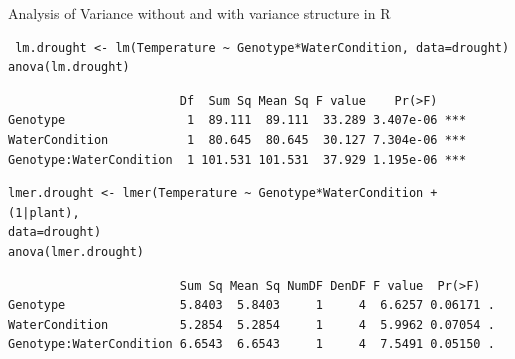 \documentclass[10pt]{beamer}
\makeatletter
\newenvironment{kframe}{%
 \def\at@end@of@kframe{}%
 \ifinner\ifhmode%
  \def\at@end@of@kframe{\end{minipage}}%
  \begin{minipage}{\columnwidth}%
 \fi\fi%
 \def\FrameCommand##1{\hskip\@totalleftmargin \hskip-\fboxsep
 \colorbox{shadecolor}{##1}\hskip-\fboxsep
     \hskip-\linewidth \hskip-\@totalleftmargin \hskip\columnwidth}%
 \MakeFramed {\advance\hsize-\width
   \@totalleftmargin\z@ \linewidth\hsize
   \@setminipage}}%
 {\par\unskip\endMakeFramed%
 \at@end@of@kframe}
\newenvironment{knitrout}{}{} %
\makeatother
\begin{document}
\begin{frame}[fragile]{Analysis of Variance without and with variance structure in R}
 
 \pause 
  \begin{knitrout}
 \footnotesize
{}\color{fgcolor}\begin{kframe}
\begin{verbatim}
 lm.drought <- lm(Temperature ~ Genotype*WaterCondition, data=drought)
anova(lm.drought)

\end{verbatim}
\end{kframe}
\end{knitrout}
\pause
  \begin{knitrout}
 \footnotesize
{}\color{fgcolor}\begin{kframe}
\begin{verbatim}
                        Df  Sum Sq Mean Sq F value    Pr(>F)    
Genotype                 1  89.111  89.111  33.289 3.407e-06 ***
WaterCondition           1  80.645  80.645  30.127 7.304e-06 ***
Genotype:WaterCondition  1 101.531 101.531  37.929 1.195e-06 ***
\end{verbatim}
\end{kframe}
\end{knitrout}

\pause
 \begin{knitrout}
 \footnotesize
{}\color{fgcolor}\begin{kframe}
\begin{verbatim}
lmer.drought <- lmer(Temperature ~ Genotype*WaterCondition + (1|plant),
data=drought)
anova(lmer.drought)
\end{verbatim}
\end{kframe}
\end{knitrout}

  \begin{knitrout}
 \footnotesize
{}\color{fgcolor}\begin{kframe}
\begin{verbatim}
                        Sum Sq Mean Sq NumDF DenDF F value  Pr(>F)  
Genotype                5.8403  5.8403     1     4  6.6257 0.06171 .
WaterCondition          5.2854  5.2854     1     4  5.9962 0.07054 .
Genotype:WaterCondition 6.6543  6.6543     1     4  7.5491 0.05150 .
\end{verbatim}
\end{kframe}
\end{knitrout}
 
\end{frame}
\end{document}
